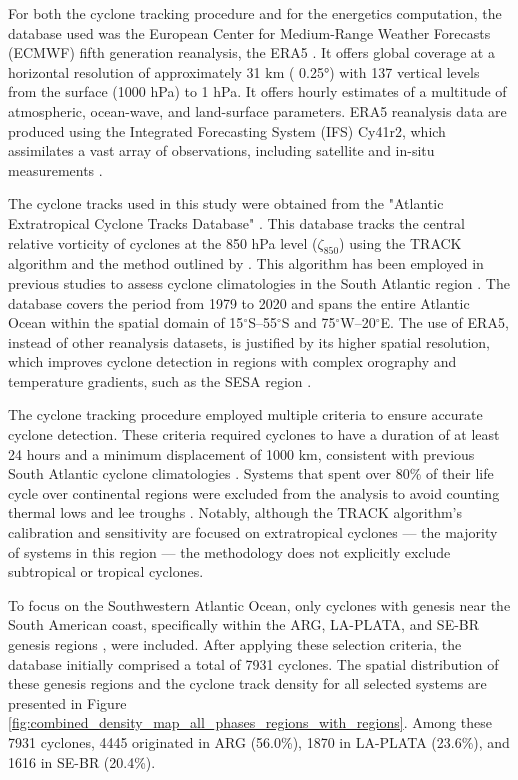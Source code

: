 \documentclass[pdflatex,sn-chicago]{sn-jnl}%
\theoremstyle{plain}
\theoremstyle{definition}
\theoremstyle{remark}
\theoremstyle{definition}
\begin{document}
For both the cyclone tracking procedure and for the energetics computation, the database used was the European Center for Medium-Range Weather Forecasts (ECMWF) fifth generation reanalysis, the ERA5 \citep{hersbach2020era5}. It offers global coverage at a horizontal resolution of approximately 31 km ( 0.25°) with 137 vertical levels from the surface (1000 hPa) to 1 hPa. It offers hourly estimates of a multitude of atmospheric, ocean-wave, and land-surface parameters. ERA5 reanalysis data are produced using the Integrated Forecasting System (IFS) Cy41r2, which assimilates a vast array of observations, including satellite and in-situ measurements \citep{hersbach2020era5}.

The cyclone tracks used in this study were obtained from the "Atlantic Extratropical Cyclone Tracks Database" \citep{gramcianinov2020data}. This database tracks the central relative vorticity of cyclones at the 850 hPa level (\(\zeta_{850}\)) using the TRACK algorithm \citep{hodges1994general, hodges1995feature} and the method outlined by \citet{hoskins2002new}. This algorithm has been employed in previous studies to assess cyclone climatologies in the South Atlantic region \citep{gramcianinov2019properties,gramcianinov2020analysis,couto2024new}. The database covers the period from 1979 to 2020 and spans the entire Atlantic Ocean within the spatial domain of 15\(^\circ\)S–55\(^\circ\)S and 75\(^\circ\)W–20\(^\circ\)E. The use of ERA5, instead of other reanalysis datasets, is justified by its higher spatial resolution, which improves cyclone detection in regions with complex orography and temperature gradients, such as the SESA region \citep{gramcianinov2020analysis}.

The cyclone tracking procedure employed multiple criteria to ensure accurate cyclone detection. These criteria required cyclones to have a duration of at least 24 hours and a minimum displacement of 1000 km, consistent with previous South Atlantic cyclone climatologies \citep{sinclair1995climatology,gramcianinov2019properties}. Systems that spent over 80\% of their life cycle over continental regions were excluded from the analysis to avoid counting thermal lows and lee troughs \citep[e.g.][]{crespo2021potential}. Notably, although the TRACK algorithm's calibration and sensitivity are focused on extratropical cyclones — the majority of systems in this region \citep{marrafon2022classificaccao} — the methodology does not explicitly exclude subtropical or tropical cyclones.  

To focus on the Southwestern Atlantic Ocean, only cyclones with genesis near the South American coast, specifically within the ARG, LA-PLATA, and SE-BR genesis regions \citep{gramcianinov2019properties,couto2024new}, were included. After applying these selection criteria, the database initially comprised a total of 7931 cyclones. The spatial distribution of these genesis regions and the cyclone track density for all selected systems are presented in Figure \ref{fig:combined_density_map_all_phases_regions_with_regions}. Among these 7931 cyclones, 4445 originated in ARG (56.0\%), 1870 in LA-PLATA (23.6\%), and 1616 in SE-BR (20.4\%). 
\end{document}
